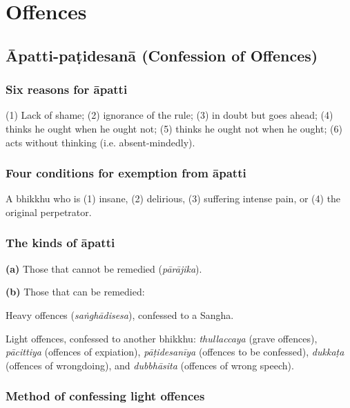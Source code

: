 \chapter{Offences}

\ifhandbookedition
\vspace*{-\baselineskip}
\fi

\section{Āpatti-paṭidesanā (Confession of Offences)}

\subsection{Six reasons for āpatti}

(1) Lack of shame; (2) ignorance of the rule; (3) in doubt
but goes ahead; (4) thinks he ought when he ought not; (5) thinks he ought not
when he ought; (6) acts without thinking (i.e. absent-mindedly).

\ifhandbookedition
\vspace*{-0.5\baselineskip}
\fi

\subsection{Four conditions for exemption from āpatti}

A bhikkhu who is (1) insane, (2) delirious, (3) suffering intense pain, or (4)
the original perpetrator.

\subsection{The kinds of āpatti}

\textbf{(a)} Those that cannot be remedied (\emph{pārājika}).

\textbf{(b)} Those that can be remedied:

Heavy offences (\emph{saṅghādisesa}), confessed to a Sangha.

Light offences, confessed to another bhikkhu: \emph{thullaccaya} (grave
offences), \emph{pācittiya} (offences of expiation), \emph{pāṭidesanīya}
(offences to be confessed), \emph{dukkaṭa} (offences of wrongdoing), and
\emph{dubbhāsita} (offences of wrong speech).

\subsection{Method of confessing light offences}
\label{confessing-light-offences}


